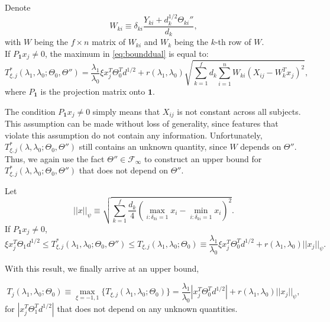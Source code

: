 \begin{lemma}
    \label{lem:3}
    Denote
    \begin{equation}
        \label{eq:w}
        W_{ki}\equiv\delta_{ki}\frac{Y_{ki}+d_k^{1/2}\Theta_{ki}''}{d_k},
    \end{equation}
    with $W$ being the $f\times n$ matrix of $W_{ki}$ and $W_k$ being the $k$-th row of $W$.\\
    If $P_{\mathbf{1}}x_j\neq 0$, the maximum in \eqref{eq:bounddual} is equal to:
    \begin{equation}
        \label{eq:tstar}
        T^*_{\xi,j}(\lambda_1,\lambda_0;\Theta_{0},\Theta'')=\frac{\lambda_1}{\lambda_0}\xi x_j^T\Theta_{0}^Td^{1/2}+r(\lambda_1,\lambda_0)\sqrt{\sum_{k=1}^fd_k\sum_{i=1}^nW_{ki}\left(X_{ij}-W_k^Tx_j\right)^2},
    \end{equation}
    where $P_{\mathbf{1}}$ is the projection matrix onto $\mathbf{1}$.
\end{lemma}

The condition $P_{\mathbf{1}}x_j \ne 0$ simply means that $X_{ij}$ is not constant across all subjects. This assumption can be made without loss of generality, since features that violate this assumption do not contain any information. Unfortunately, $T^*_{\xi,j}(\lambda,\lambda_0;\Theta_{0},\Theta'')$ still contains an unknown quantity, since $W$ depends on $\Theta''$. Thus, we again use the fact $\Theta''\in\mathcal{F}_\infty$ to construct an upper bound for $T^*_{\xi,j}(\lambda,\lambda_0;\Theta_{0},\Theta'')$ that does not depend on $\Theta''$.

\begin{theorem}
    \label{thm:2}
    Let
    \begin{equation}
        \label{eq:prod}
        ||x||_\psi\equiv\sqrt{\sum_{k=1}^f\frac{d_k}{4}\left(\max_{i:\delta_{ki}=1}x_i-\min_{i:\delta_{ki}=1}x_i\right)^2}.
    \end{equation}
    If $P_{\mathbf{1}}x_j\neq 0$,
    \begin{equation}
        \label{eq:gbbar}
        \xi x_j^T\Theta_{1}d^{1/2}\leq T^*_{\xi,j}(\lambda_1,\lambda_0;\Theta_{0},\Theta'')\leq T_{\xi,j}(\lambda_1,\lambda_0;\Theta_{0})\equiv\frac{\lambda_1}{\lambda_0}\xi x_j^T\Theta_{0}^Td^{1/2}+r(\lambda_1,\lambda_0)||x_j||_\psi.
    \end{equation}
\end{theorem}

With this result, we finally arrive at an upper bound,

\begin{equation}
    \label{eq:bound}
    T_j(\lambda_1,\lambda_0;\Theta_{0})\equiv\max_{\xi=-1,1}\{T_{\xi,j}(\lambda_1,\lambda_0;\Theta_{0})\}=\frac{\lambda_1}{\lambda_0}\left| x_j^T\Theta_{0}^Td^{1/2}\right|+r(\lambda_1,\lambda_0)||x_j||_\psi,
\end{equation}
for $|x_j^T\Theta^T_{1}d^{1/2}|$ that does not depend on any unknown quantities. 

